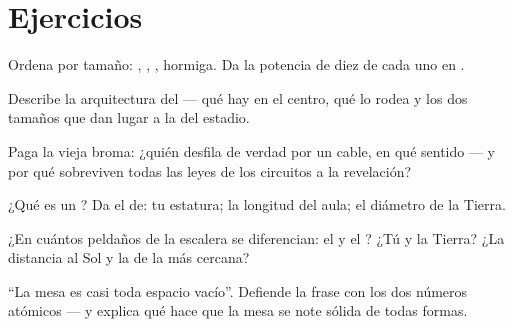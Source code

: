\section{Ejercicios}

\begin{exercise}[$\star$]\label{exo:g9:atoms-to-galaxies:1}
Ordena por tamaño: , ,
, hormiga. Da la potencia de diez de cada uno en
.
\end{exercise}

\begin{exercise}[$\star$]\label{exo:g9:atoms-to-galaxies:2}
Describe la arquitectura del  --- qué hay en el centro, qué lo
rodea y los dos tamaños que dan lugar a la  del estadio.
\end{exercise}

\begin{exercise}[$\star$]\label{exo:g9:atoms-to-galaxies:3}
Paga la vieja broma: ¿quién desfila de verdad por un cable, en qué
sentido --- y por qué sobreviven todas las leyes de los circuitos a la
revelación?
\end{exercise}

\begin{exercise}[$\star$]\label{exo:g9:atoms-to-galaxies:4}
¿Qué es un ? Da el  de: tu
estatura; la longitud del aula; el diámetro de la Tierra.
\end{exercise}

\begin{exercise}[$\star$]\label{exo:g9:atoms-to-galaxies:5}
¿En cuántos peldaños de la escalera se diferencian: el
 y el ? ¿Tú y la Tierra? ¿La distancia al
Sol y la de la  más cercana?
\end{exercise}

\begin{exercise}[$\star$]\label{exo:g9:atoms-to-galaxies:6}
``La mesa es casi toda espacio vacío''. Defiende la frase con los dos
números atómicos --- y explica qué hace que la mesa se note
sólida de todas formas.
\end{exercise}

